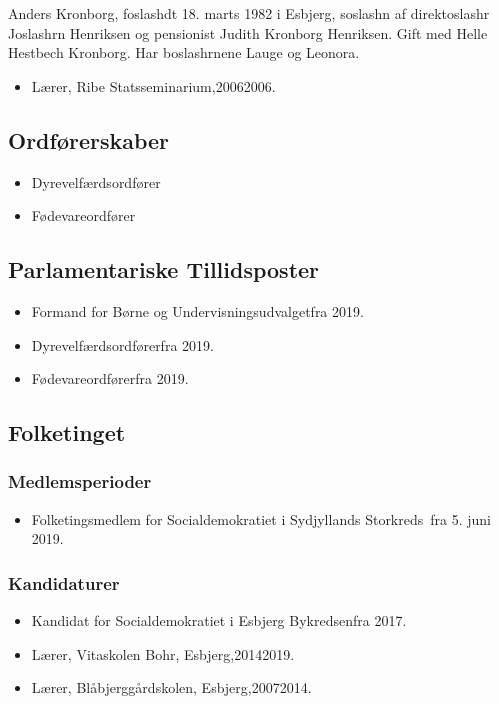 \documentclass[11pt, a4paper]{awesome-cv}
\begin{document}
\makecvheader[R]
\makelettertitle
\begin{cvletter}
Anders Kronborg, foslashdt 18. marts 1982 i Esbjerg, soslashn af direktoslashr Joslashrn Henriksen og pensionist Judith Kronborg Henriksen. Gift med Helle Hestbech Kronborg. Har boslashrnene Lauge og Leonora.

\begin{itemize}
\item Lærer, Ribe Statsseminarium,20062006.
\end{itemize}
\subsection*{Ordførerskaber}
\begin{itemize}
\item Dyrevelfærdsordfører
\item Fødevareordfører
\end{itemize}
\subsection*{Parlamentariske Tillidsposter}
\begin{itemize}
\item Formand for Børne og Undervisningsudvalgetfra 2019.
\item Dyrevelfærdsordførerfra 2019.
\item Fødevareordførerfra 2019.
\end{itemize}
\subsection*{Folketinget}
\subsubsection*{Medlemsperioder}
\begin{itemize}
\item Folketingsmedlem for Socialdemokratiet i Sydjyllands Storkreds fra 5. juni 2019.
\end{itemize}
\subsubsection*{Kandidaturer}
\begin{itemize}
\item Kandidat for Socialdemokratiet i Esbjerg Bykredsenfra 2017.
\end{itemize}
\begin{itemize}
\item Lærer, Vitaskolen Bohr, Esbjerg,20142019.
\item Lærer, Blåbjerggårdskolen, Esbjerg,20072014.
\end{itemize}
\end{cvletter}
\end{document}
